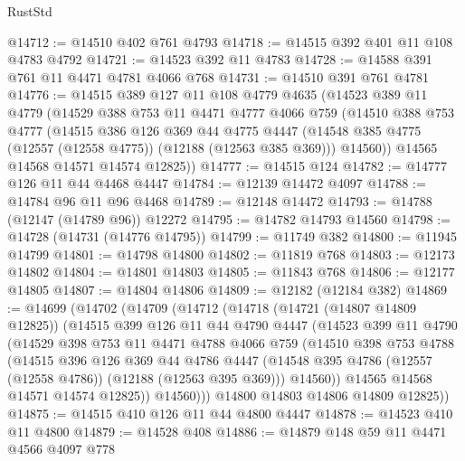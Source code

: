 \begin{lexlean}{RustStd}
\begin{coremodule}
@14712 := @14510 @402 @761 @4793
@14718 := @14515 @392 @401 @11 @108 @4783 @4792
@14721 := @14523 @392 @11 @4783
@14728 := @14588 @391 @761 @11 @4471 @4781 @4066 @768
@14731 := @14510 @391 @761 @4781
@14776 := @14515
    @389
    @127
    @11
    @108
    @4779
    @4635
    (@14523
      @389
      @11
      @4779
      (@14529
        @388
        @753
        @11
        @4471
        @4777
        @4066
        @759
        (@14510
          @388
          @753
          @4777
          (@14515
            @386
            @126
            @369
            @44
            @4775
            @4447
            (@14548 @385 @4775 (@12557 (@12558 @4775)) (@12188 (@12563 @385 @369)))
            @14560))
        @14565
        @14568
        @14571
        @14574
        @12825))
@14777 := @14515 @124
@14782 := @14777 @126 @11 @44 @4468 @4447
@14784 := @12139 @14472 @4097
@14788 := @14784 @96 @11 @96 @4468
@14789 := @12148 @14472
@14793 := @14788 (@12147 (@14789 @96)) @12272
@14795 := @14782 @14793 @14560
@14798 := @14728 (@14731 (@14776 @14795))
@14799 := @11749 @382
@14800 := @11945 @14799
@14801 := @14798 @14800
@14802 := @11819 @768
@14803 := @12173 @14802
@14804 := @14801 @14803
@14805 := @11843 @768
@14806 := @12177 @14805
@14807 := @14804 @14806
@14809 := @12182 (@12184 @382)
@14869 := @14699
    (@14702
      (@14709
        (@14712
          (@14718
            (@14721 (@14807 @14809 @12825))
            (@14515
              @399
              @126
              @11
              @44
              @4790
              @4447
              (@14523
                @399
                @11
                @4790
                (@14529
                  @398
                  @753
                  @11
                  @4471
                  @4788
                  @4066
                  @759
                  (@14510
                    @398
                    @753
                    @4788
                    (@14515
                      @396
                      @126
                      @369
                      @44
                      @4786
                      @4447
                      (@14548 @395 @4786 (@12557 (@12558 @4786)) (@12188 (@12563 @395 @369)))
                      @14560))
                  @14565
                  @14568
                  @14571
                  @14574
                  @12825))
              @14560)))
        @14800
        @14803
        @14806
        @14809
        @12825))
@14875 := @14515 @410 @126 @11 @44 @4800 @4447
@14878 := @14523 @410 @11 @4800
@14879 := @14528 @408
@14886 := @14879 @148 @59 @11 @4471 @4566 @4097 @778

\end{coremodule}
\end{lexlean}
